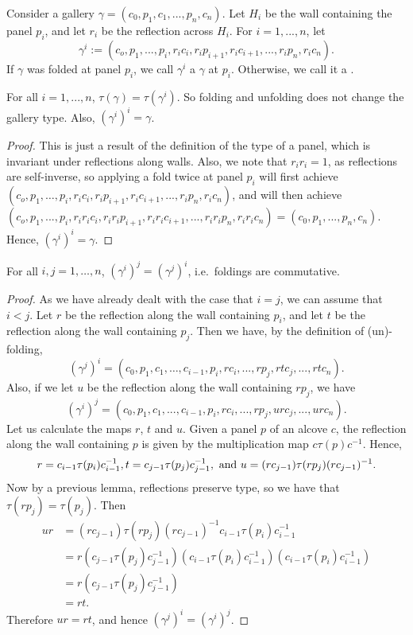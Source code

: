\documentclass[11pt]{article}
\begin{document}
\begin{definition}
    Consider a gallery $\gamma = (c_0,p_1,c_1,...,p_n,c_n)$. Let $H_i$ be the wall containing the panel $p_i$, and let $r_i$ be the reflection across $H_i$. For $i=1,...,n$, let
    \[\gamma^i:=(c_o,p_1,...,p_i,r_ic_i,r_ip_{i+1},r_ic_{i+1},...,r_ip_n,r_ic_n).\]
    If $\gamma$ was folded at panel $p_i$, we call $\gamma^i$ a $\gamma$ at $p_i$. Otherwise, we call it a .
\end{definition}

\begin{lemma}
    For all $i=1,...,n$, $\tau(\gamma)=\tau(\gamma^i)$. So folding and unfolding does not change the gallery type. Also, $(\gamma^i)^i=\gamma$.
\end{lemma}

\begin{proof}
    This is just a result of the definition of the type of a panel, which is invariant under reflections along walls. Also, we note that $r_ir_i=1$, as reflections are self-inverse, so applying a fold twice at panel $p_i$ will first achieve $(c_o,p_1,\hdots,p_i,r_ic_i,r_ip_{i+1},r_ic_{i+1},...,r_ip_n,r_ic_n)$, and will then achieve $(c_o,p_1,...,p_i,r_ir_ic_i,r_ir_ip_{i+1},r_ir_ic_{i+1},...,r_ir_ip_n,r_ir_ic_n)=(c_0,p_1,...,p_n,c_n)$. Hence, $(\gamma^i)^i=\gamma$.
\end{proof}

\begin{lemma}
    For all $i,j=1,\hdots,n$, $(\gamma^i)^j=(\gamma^j)^i$, i.e.\ foldings are commutative.
\end{lemma}

\begin{proof}
    As we have already dealt with the case that $i=j$, we can assume that $i<j$. Let $r$ be the reflection along the wall containing $p_i$, and let $t$ be the reflection along the wall containing $p_j$. Then we have, by the definition of (un)-folding,
    \[(\gamma^j)^i=(c_0,p_1,c_1,\hdots,c_{i-1},p_i,rc_i,...,rp_j,rtc_j,...,rtc_n).\]
    Also, if we let $u$ be the reflection along the wall containing $rp_j$, we have
    \[(\gamma^i)^j=(c_0,p_1,c_1,...,c_{i-1},p_i,rc_i,...,rp_j,urc_j,...,urc_n).\]
    Let us calculate the maps $r$, $t$ and $u$. Given a panel $p$ of an alcove $c$, the reflection along the wall containing $p$ is given by the multiplication map $c\tau(p)c^{-1}$. Hence,
    \[r=c_{i-1}\tau(p_i)c_{i-1}^{-1}, t=c_{j-1}\tau(p_j)c_{j-1}^{-1}, \textnormal{ and } u=(rc_{j-1})\tau(rp_j)(rc_{j-1})^{-1}.\]
    Now by a previous lemma, reflections preserve type, so we have that $\tau(rp_j)=\tau(p_j)$. Then
    \[\begin{aligned}
        ur & =(rc_{j-1})\tau(rp_j)(rc_{j-1})^{-1}c_{i-1}\tau(p_i)c_{i-1}^{-1}\\
           & =r(c_{j-1}\tau(p_j)c_{j-1}^{-1})(c_{i-1}\tau(p_i)c_{i-1}^{-1})(c_{i-1}\tau(p_i)c_{i-1}^{-1})\\
           & = r(c_{j-1}\tau(p_j)c_{j-1}^{-1})\\
           & =rt.
    \end{aligned}\]
    Therefore $ur=rt$, and hence $(\gamma^j)^i=(\gamma^i)^j$.
\end{proof}
\end{document}
